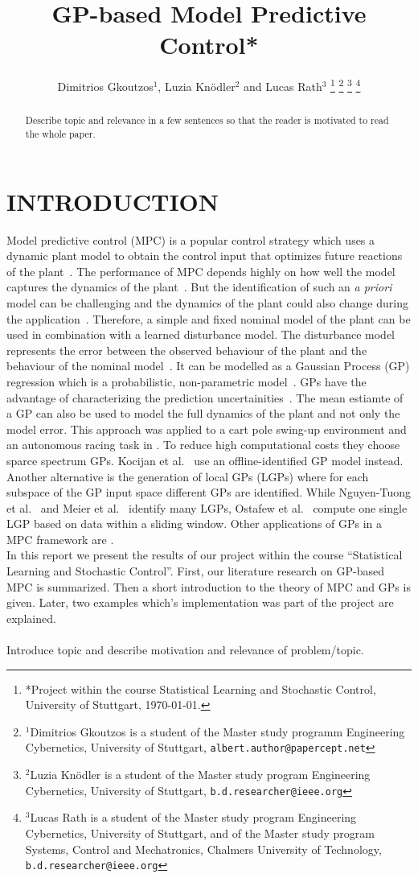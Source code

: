 \documentclass[letterpaper, 10 pt, conference]{ieeeconf}  %
\title{\LARGE \bf
GP-based Model Predictive Control*
}
\author{Dimitrios Gkoutzos$^{1}$, Luzia Knödler$^{2}$ and Lucas Rath$^{3}$%
\thanks{*Project within the course Statistical Learning and Stochastic Control, University of Stuttgart, \today.}%
\thanks{$^{1}$Dimitrios Gkoutzos is a student of the Master study programm Engineering Cybernetics, University of Stuttgart,
        {\tt\small albert.author@papercept.net}}%
\thanks{$^{2}$Luzia Knödler is a student of the Master study program Engineering Cybernetics, University of Stuttgart,
        {\tt\small b.d.researcher@ieee.org}}%
\thanks{$^{3}$Lucas Rath is a student of the Master study program Engineering Cybernetics, University of Stuttgart, and of the Master study program Systems, Control and Mechatronics, Chalmers University of Technology,
        {\tt\small b.d.researcher@ieee.org}}%
}
\begin{document}
\maketitle
\thispagestyle{empty}
\pagestyle{empty}


\begin{abstract}

Describe topic and relevance in a few sentences so that the reader is motivated to
read the whole paper.

\end{abstract}


\section{INTRODUCTION}
Model predictive control (MPC) is a popular control strategy which uses a dynamic plant model to obtain the control input that optimizes future reactions of the plant~\cite{kocijan2004gaussian}. The performance of MPC depends highly on how well the model captures the dynamics of the plant~\cite{kabzan2019learning}. But the identification of such an \textit{a priori} model can be challenging and the dynamics of the plant could also change during the application~\cite{kabzan2019learning,ostafew2014learning}. Therefore, a simple and fixed nominal model of the plant can be used in combination with a learned disturbance model. The disturbance model represents the error between the observed behaviour of the plant and the behaviour of the nominal model~\cite{ostafew2014learning}. It can be modelled as a Gaussian Process (GP) regression which is a probabilistic, non-parametric model~\cite{kocijan2004gaussian}. GPs have the advantage of characterizing the prediction uncertainities~\cite{kocijan2004gaussian}. The mean estiamte of a GP can also be used to model the full dynamics of the plant and not only the model error. This approach was applied to a cart pole swing-up environment and an autonomous racing task in \cite{van2017online}. To reduce high computational costs they choose sparce spectrum GPs. Kocijan et al.~\cite{kocijan2004gaussian} use an offline-identified GP model instead. Another alternative is the generation of local GPs (LGPs) where for each subspace of the GP input space different GPs are identified. While Nguyen-Tuong et al.~\cite{nguyen2009local} and Meier et al.~\cite{meier2014efficient} identify many LGPs, Ostafew et al.~\cite{ostafew2014learning} compute one single LGP based on data within a sliding window. Other applications of GPs in a MPC framework are .
 \\
In this report we present the results of our project within the course ``Statistical Learning and Stochastic Control''. First, our literature research on GP-based MPC is summarized. Then a short introduction to the theory of MPC and GPs is given. Later, two examples which's  implementation was part of the project are explained.\\
  \\
Introduce topic and describe motivation and relevance of problem/topic.
\end{document}
